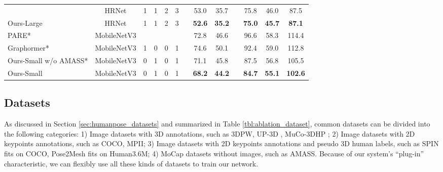 \documentclass{article}
\newcommand{\ie}{\textit{i}.\textit{e}.}
\begin{document}
\begin{table*}[t]
{\begin{tabular}{lcccccccccccc}
& HRNet & 1 & 1 & 2 & 3 &&        53.0      & 35.7      &&   75.8       & 46.0    &  87.5  \\
Ours-Large                  
& HRNet & 1 & 1 & 2 & 3 &&        \textbf{52.6}      & \textbf{35.2}      &&   \textbf{75.0}       & \textbf{45.7}    &  \textbf{87.1}  \\
\midrule
PARE* \cite{kocabas2021pare} 
& MobileNetV3 & & & & &&     72.8      & 46.6         &&   96.6    & 58.3  & 114.4    \\
Graphormer* \cite{lin2021-mesh-graphormer}             
& MobileNetV3 & 1 & 0 & 0 & 1 &&   74.6      & 50.1      &&    92.4      &   59.0 & 112.8   \\
Ours-Small w/o AMASS*           
& MobileNetV3 & 0 & 1 & 0 & 1 &&  71.1     & 45.8     &&    87.5      &     56.8 &  105.5 \\ 
Ours-Small             
& MobileNetV3 & 0 & 1 & 0 & 1 &&  \textbf{68.2}     & \textbf{44.2}     &&    \textbf{84.7}      &     \textbf{55.1} &  \textbf{102.6} \\ 
\bottomrule
\end{tabular}
}
\vspace{-5pt}
\caption{Performance comparison with state-of-the-art methods.``-'' denotes the results that are not available. Methods with ``*'' are trained with the same datasets (\ie, the first three types of datasets described in Section \ref{sec:train_dataset}) for a fair comparison. 
}
 \vspace{-10pt}
\label{tbl:compari_hm36}
\end{table*}

\subsection{Datasets}
\label{sec:train_dataset}
As discussed in Section \ref{sec:humanpose_datasets} and summarized in Table \ref{tbl:ablation_dataset}, common datasets can be divided into the following categories: 1) Image datasets with 3D annotations, such as 3DPW, UP-3D \cite{Lassner:UP:2017}, MuCo-3DHP \cite{mehta_3dv18}; 2) Image datasets with 2D keypoints annotations, such as COCO, MPII; 3) Image datasets with 2D keypoints annotations and pseudo 3D human labels, such as SPIN fits on COCO, Pose2Mesh fits on Human3.6M; 4) MoCap datasets without images, such as AMASS. Because of our system's ``plug-in'' characteristic, we can flexibly use all these kinds of datasets to train our network. 
\end{document}
